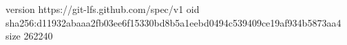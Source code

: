 version https://git-lfs.github.com/spec/v1
oid sha256:d11932abaaa2fb03ee6f15330bd8b5a1eebd0494c539409ce19af934b5873aa4
size 262240

